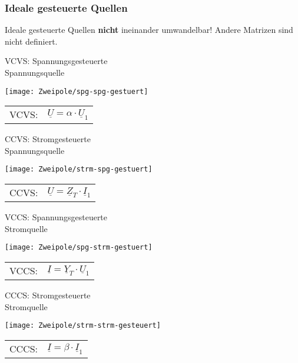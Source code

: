 \subsubsection{Ideale gesteuerte Quellen}
Ideale gesteuerte Quellen \textbf{nicht} ineinander umwandelbar! Andere Matrizen sind nicht definiert.\\
\begin{minipage}[t]{0.5\columnwidth}
\footnotesize
VCVS: Spannungsgesteuerte\\ Spannungsquelle
\normalsize
\begin{center}
	\texttt{[image: Zweipole/spg-spg-gestuert]}\\
	\begin{tabular}{cc}
		VCVS:& $\underline{U}=\alpha\cdot \underline{U}_1$
	\end{tabular}
\end{center}
\end{minipage}
\begin{minipage}[t]{0.5\columnwidth}
 \footnotesize
	CCVS: Stromgesteuerte \\ Spannungsquelle
	\normalsize
	\begin{center}
		\texttt{[image: Zweipole/strm-spg-gestuert]}\\
		\begin{tabular}{cc}
				CCVS: & $\underline{U}=\underline{Z}_T\cdot \underline{I}_1$
		\end{tabular}
	\end{center}
\end{minipage}
\begin{minipage}[t]{0.5\columnwidth}
	\footnotesize
	VCCS: Spannungsgesteuerte\\ Stromquelle
	\normalsize
	\begin{center}
		\texttt{[image: Zweipole/spg-strm-gestuert]}\\
		\begin{tabular}{cc}
			VCCS:& $\underline{I}=\underline{Y}_T\cdot \underline{U}_1$
		\end{tabular}
	\end{center}
\end{minipage}
\begin{minipage}[t]{0.5\columnwidth}
	\footnotesize
	CCCS: Stromgesteuerte\\ Stromquelle
	\normalsize
	\begin{center}
		\texttt{[image: Zweipole/strm-strm-gesteuert]}\\
		\begin{tabular}{cc}
			CCCS:& $\underline{I}=\beta\cdot \underline{I}_1$
		\end{tabular}
	\end{center}
\end{minipage}

